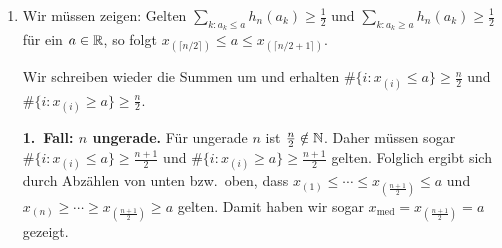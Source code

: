\begin{satz}
\begin{enumerate}[label=(\alph*)]
        Unter Verwendung der Definition der absoluten empirischen Häufigkeitsverteilung sehen wir, dass
        \[
            \sum_{\substack{k=1:\\ a_k\leq x_{\mathrm{med}}}}^s h_n(a_k)
            = \frac1n \sum_{\substack{k=1:\\ a_k\leq x_{\mathrm{med}}}}^s H_n(a_k)
            = \frac1n \#\{i\in\{1,\dots,n\}: x_i\leq x_{\mathrm{med}}\}
            = \frac1n \#\{i\in\{1,\dots,n\}: x_{(i)}\leq x_{\mathrm{med}}\} \cdot
        \]

        \textbf{1.\ Fall: $n$ ungerade.} Für ungerade $n$ ist $x_{\mathrm{med}}=x_{\left(\frac{n+1}2\right)}$, und daher
        \[
            \#\{i\in\{1,\dots,n\}: x_{(i)}\leq x_{\mathrm{med}}\} \geq \frac{n+1}{2} \geq \frac n2 ,
        \]
        weil mindestens die $\frac{n+1}2$ Elemente $x_{(1)}\leq\cdots\leq x_{\left(\frac{n+1}2\right)}$ in der Menge sind.
        Daraus folgt die Behauptung.

        Beispiel: $n=5$, geordnete Stichprobe $1,1,2,2,5$ (Augenzahl beim Würfeln).
        Es ist $x_{\mathrm{med}}=x_{(3)}=2$, und
        $\frac15\#\{i: x_{(i)}\leq 2\} = \frac45\geq\frac12$, ebenso $\sum_{k: a_k\leq x_{\mathrm{med}}} h_5(a_k) = h_5(1)+h_5(2)=\frac25+\frac25=\frac45\geq\frac12$.

        \textbf{2.\ Fall: $n$ gerade.} Für gerade $n$ ist $x_{\mathrm{med}}=\frac12\left[x_{\left(\frac n2\right)}+x_{\left(\frac n2+1\right)}\right]\geq x_{\left(\frac n2\right)}$, weil $x_{\left(\frac n2+1\right)}\geq x_{\left(\frac n2\right)}$.
        Daher gilt
        $\#\{i: x_{(i)}\leq x_{\mathrm{med}}\}\geq \frac n2$, weil mindestens die $\frac n2$ Elemente $x_{(1)}\leq\cdots\leq x_{\left(\frac n2\right)}$ in der Menge sind.

        Beispiel: $n=6$, geordnete Stichprobe $1,1,1,2,2,5$.
        Es ist $x_{\mathrm{med}}=\frac12[x_{(3)}+x_{(4)}]=\frac32$, und
        $\frac16\#\{i: x_{(i)}\leq \frac32\} = \frac36=\frac12\geq\frac12$, ebenso $h_6(1)=\frac36=\frac12\geq\frac12$.

        \item Wir müssen zeigen: Gelten $\sum_{k: a_k\leq a} h_n(a_k)\geq\frac12$ und $\sum_{k: a_k\geq a} h_n(a_k)\geq\frac12$ für ein $a\in\mathbb{R}$, so folgt $x_{(\lceil n/2\rceil)}\leq a\leq x_{(\lceil n/2+1\rceil)}$.

        Wir schreiben wieder die Summen um und erhalten $\#\{i: x_{(i)}\leq a\}\geq\frac n2$ und $\#\{i: x_{(i)}\geq a\}\geq\frac n2$.

        \textbf{1.\ Fall: $n$ ungerade.} Für ungerade $n$ ist $\frac n2\notin\mathbb{N}$.
        Daher müssen sogar $\#\{i: x_{(i)}\leq a\}\geq\frac{n+1}2$ und $\#\{i: x_{(i)}\geq a\}\geq\frac{n+1}2$ gelten.
        Folglich ergibt sich durch Abzählen von unten bzw.\ oben, dass $x_{(1)}\leq\cdots\leq x_{\left(\frac{n+1}2\right)}\leq a$ und $x_{(n)}\geq\cdots\geq x_{\left(\frac{n+1}2\right)}\geq a$ gelten.
        Damit haben wir sogar $x_{\mathrm{med}}=x_{\left(\frac{n+1}2\right)}=a$ gezeigt.


\end{enumerate}
\end{satz}
